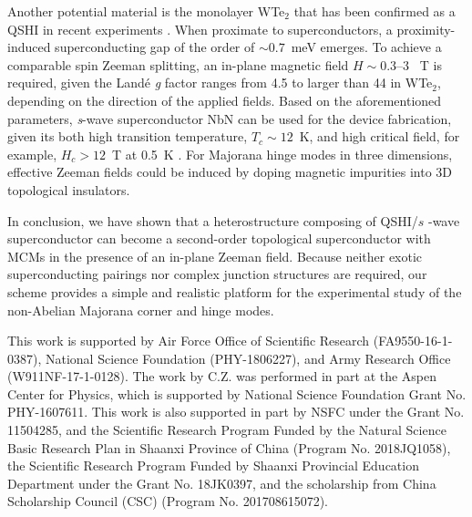 \documentclass[twocolumn,prl,floatfix,citeautoscript,nofootinbib,superscriptaddress]{revtex4}
\begin{document}
Another potential material is the monolayer WTe$_{2}$ \cite{Qian2014} that
has been confirmed as a QSHI in recent experiments \cite{Wu2018,Shi2019}.
When proximate to superconductors, a proximity-induced superconducting gap
of the order of $\sim 0.7$~meV \cite{Lupke2019} emerges. To achieve a
comparable spin Zeeman splitting, an in-plane magnetic field $H\sim 0.3$--$3$%
~T is required, given the Land\'{e} \emph{g} factor ranges from 4.5 \cite%
{Wu2018,Aivazian2015} to larger than 44 \cite{Bi2018} in WTe$_{2}$,
depending on the direction of the applied fields. Based on the
aforementioned parameters, \emph{s}-wave superconductor NbN can be used for
the device fabrication, given its both high transition temperature, $%
T_{c}\sim 12$~K, and high critical field, for example, $H_{c}>12$~T at 0.5~K
\cite{Xiaoyan2019}. For Majorana hinge modes in three dimensions, effective
Zeeman fields could be induced by doping magnetic impurities into 3D
topological insulators.


In conclusion, we have shown that a heterostructure composing of QSHI/$s$%
-wave superconductor can become a second-order topological superconductor
with MCMs in the presence of an in-plane Zeeman field. Because neither
exotic superconducting pairings nor complex junction structures are
required, our scheme provides a simple and realistic platform for the
experimental study of the non-Abelian Majorana corner and hinge modes.

\begin{acknowledgments}
This work is supported by Air Force Office of Scientific Research
(FA9550-16-1-0387), National Science Foundation (PHY-1806227), and Army
Research Office (W911NF-17-1-0128). The work by C.Z. was performed in part
at the Aspen Center for Physics, which is supported by National Science
Foundation Grant No. PHY-1607611. This work is also supported in part by
NSFC under the Grant No. 11504285, and the Scientific Research Program
Funded by the Natural Science Basic Research Plan in Shaanxi Province of
China (Program No. 2018JQ1058), the Scientific Research Program Funded by
Shaanxi Provincial Education Department under the Grant No. 18JK0397, and
the scholarship from China Scholarship Council (CSC) (Program No.
201708615072).
\end{acknowledgments}
\end{document}
